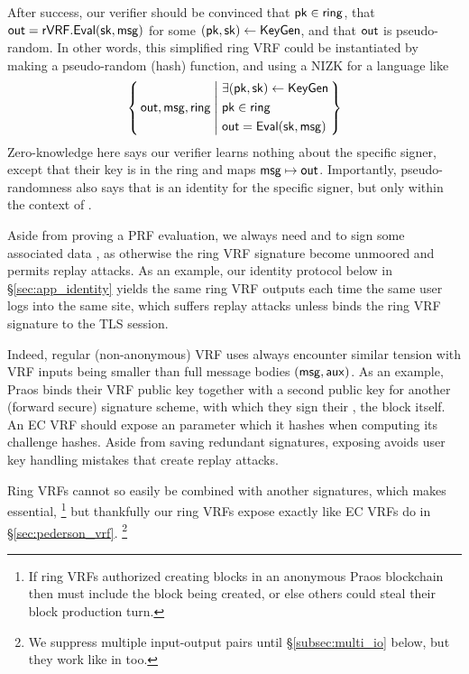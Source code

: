 After success, our verifier should be convinced that $\mathsf{pk} \in \mathsf{ring}$, that
${\mathsf{out}} = {\mathsf{rVRF}}.{\mathsf{Eval}}(\mathsf{sk},\mathsf{msg})$ for some $(\mathsf{pk},\mathsf{sk}) \leftarrow {\ensuremath{\mathsf{KeyGen}}}$,
 and that ${\mathsf{out}}$ is pseudo-random.
In other words, this simplified ring VRF could be instantiated by making
\Eval a pseudo-random (hash) function, and using a NIZK for a language like
$$ \Setst{ \Out, \msg, \ring}{
    \eprint{
        \exists (\pk,\sk) \leftarrow \KeyGen, \quad %
        \pk \in \ring, \quad
        \Out = \Eval(\sk,\msg)
    }{
        \begin{aligned}
        & \exists (\pk,\sk) \leftarrow \KeyGen \\
        & \pk \in \ring \\
        & \Out = \Eval(\sk,\msg)
        \end{aligned}
    }
} $$
Zero-knowledge here says our verifier learns nothing about the specific
signer, except that their key is in the ring and maps $\mathsf{msg} \mapsto {\ensuremath{\mathsf{out}}}$.
Importantly, pseudo-randomness also says that \Out is an identity
for the specific signer, but only within the context of \msg.


Aside from proving a PRF evaluation, 
we always need \rSign and \rVerify to sign some associated data \aux,
as otherwise the ring VRF signature become unmoored and permits replay attacks.
%
As an example, our identity protocol below in \S\ref{sec:app_identity}
yields the same ring VRF outputs each time the same user logs into the
same site, which suffers replay attacks unless \aux binds the
ring VRF signature to the TLS session.

Indeed, regular (non-anonymous) VRF uses always encounter similar tension
with VRF inputs \msg being smaller than full message bodies $(\mathsf{msg},\mathsf{aux})$.
As an example, Praos \cite{praos} binds their VRF public key together
with a second public key for another (forward secure) signature scheme,
with which they sign their \aux, the block itself.
%
An EC VRF should expose an \aux parameter which it hashes when computing
its challenge hashes.  Aside from saving redundant signatures, exposing
\aux avoids user key handling mistakes that create replay attacks.

Ring VRFs cannot so easily be combined with another signatures, which
makes \aux essential,%
\footnote{If ring VRFs authorized creating blocks in an anonymous Praos blockchain then \aux must include the block being created, or else others could steal their block production turn.}
but thankfully our ring VRFs expose \aux exactly like EC VRFs do in \S\ref{sec:pederson_vrf}.%
\footnote{We suppress multiple input-output pairs until \S\ref{subsec:multi_io} below, but they work like in \cite{PrivacyPass} too.}

